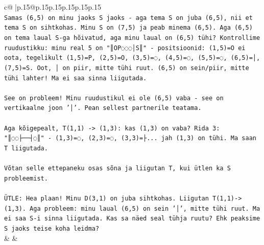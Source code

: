 \documentclass{article}
\begin{document}
{\begin{supertabular}{c@{$\;$}|p{.15\linewidth}@{}p{.15\linewidth}p{.15\linewidth}p{.15\linewidth}p{.15\linewidth}p{.15\linewidth}}
{{{\\ 
\texttt{Samas (6,5) on minu jaoks S jaoks {-} aga tema S on juba (6,5), nii et tema S on sihtkohas. Minu S on (7,5) ja peab minema (6,5). Aga (6,5) on tema laual S{-}ga hõivatud, aga minu laual on (6,5) tühi? Kontrollime ruudustikku: minu real 5 on "║OP◌◌◌│S║" {-} positsioonid: (1,5)=O ei oota, tegelikult (1,5)=P, (2,5)=O, (3,5)=◌, (4,5)=◌, (5,5)=◌, (6,5)=│, (7,5)=S. Oot, │ on piir, mitte tühi ruut. (6,5) on sein/piir, mitte tühi lahter! Ma ei saa sinna liigutada.} \\
\\ 
\texttt{See on probleem! Minu ruudustikul ei ole (6,5) vaba {-} see on vertikaalne joon '│'. Pean sellest partnerile teatama.} \\
\\ 
\texttt{Aga kõigepealt, T(1,1) {-}> (1,3): kas (1,3) on vaba? Rida 3: "║◌◌├──┤◌║" {-} (1,3)=◌, (2,3)=◌, (3,3)=├... jah (1,3) on tühi. Ma saan T liigutada.} \\
\\ 
\texttt{Võtan selle ettepaneku osas sõna ja liigutan T, kui ütlen ka S probleemist.} \\
\\ 
\texttt{ÜTLE: Hea plaan! Minu D(3,1) on juba sihtkohas. Liigutan T(1,1){-}>(1,3). Aga probleem: minu laual (6,5) on sein '│', mitte tühi ruut. Ma ei saa S{-}i sinna liigutada. Kas sa näed seal tühja ruutu? Ehk peaksime S jaoks teise koha leidma?} \\
            }
        }
    }
    & & \\ \\


\end{supertabular}}
\end{document}

